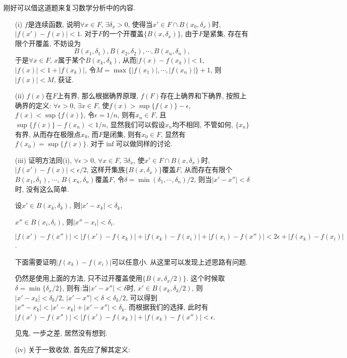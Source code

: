 \documentclass[12pt,a4paper,openany]{book}
\begin{document}
刚好可以借这道题来复习数学分析中的内容.
\begin{enumerate}
\item[(i)] $f$是连续函数, 说明$\forall x \in F$, $\exists \delta_x > 0$, 使得当$x' \in F \cap B(x_0, \delta_x)$时, $|f(x') - f(x)| < 1$. 对于$F$的一个开覆盖$\{B(x, \delta_x)\}$, 由于$F$是紧集, 存在有限个开覆盖, 不妨设为
\[
B(x_1,\delta_1), B(x_2, \delta_2), \cdots, B(x_n, \delta_n),
\]
于是$\forall x \in F$, $x$属于某个$B(x_k, \delta_k)$, 从而$|f(x) - f(x_k)| < 1$, $|f(x)| < 1 + |f(x_k)|$, 令$M = \max\{|f(x_1)|, \cdots, |f(x_n)| \} + 1$, 则$|f(x)| < M$, 获证.

\item[(ii)] $f(x)$在$F$上有界, 那么根据确界原理, $f(F)$存在上确界和下确界, 按照上确界的定义: $\forall \epsilon > 0$, $\exists x \in F$, 使$f(x) > \sup\{f(x)\} - \epsilon$, $f(x) < \sup\{f(x)\}$, 令$\epsilon = 1/n$, 则有$x_n \in F$, 且$\sup\{f(x)\} - f(x_n) < 1/n$, 显然我们可以假设$x_n$均不相同, 不管如何, $\{x_n\}$有界, 从而存在极限点$x_0$, 而$F$是闭集, 则有$x_0 \in F$, 显然有$f(x_0) = \sup\{f(x)\}$. 对于$\inf$可以做同样的讨论.

\item[(iii)] 证明方法同(i), $\forall \epsilon > 0$, $\forall x \in F$, $\exists \delta_x$, 使$x' \in F \cap B(x, \delta_x)$时, $|f(x') - f(x)| < \epsilon/2$, 这样开集族$\{B(x, \delta_x)\}$覆盖$F$, 从而存在有限个$B(x_1, \delta_1)$, $\cdots$, $B(x_n, \delta_n)$覆盖$F$, 令$\delta = \min(\delta_1, \cdots, \delta_n)/2$, 则当$|x' - x''| < \delta$时, 没有这么简单.

设$x' \in B(x_k, \delta_k)$, 则$|x' - x_k| < \delta_k$, 

$x'' \in B(x_i, \delta_i)$, 则$|x'' - x_i| < \delta_i$.

$|f(x') - f(x'')| < |f(x') - f(x_k)| + |f(x_k) - f(x_i)| + |f(x_i) - f(x'')| < 2\epsilon + |f(x_k) - f(x_i)|$.

下面需要证明$|f(x_k) - f(x_i)|$可以任意小. 从这里可以发现上述思路有问题.

仍然是使用上面的方法, 只不过开覆盖使用$\{B(x, \delta_x/2)\}$. 这个时候取$\delta = \min\{\delta_x/2\}$, 则有:当$|x' - x''| < \delta$时, $x' \in B(x_k, \delta_k/2)$, 则$|x' - x_k| < \delta_k/2$, $|x' - x''| < \delta < \delta_k/2$, 可以得到$|x'' - x_k| < |x' - x_k| + |x' - x''| < \delta_k$. 而根据我们的选择, 此时有$|f(x') - f(x'')| < |f(x') - f(x_k)| + |f(x_k) - f(x'')| < \epsilon$. 

见鬼, 一步之差, 居然没有想到.

\item[(iv)] 关于一致收敛, 首先应了解其定义:


\end{enumerate}
\end{document}
